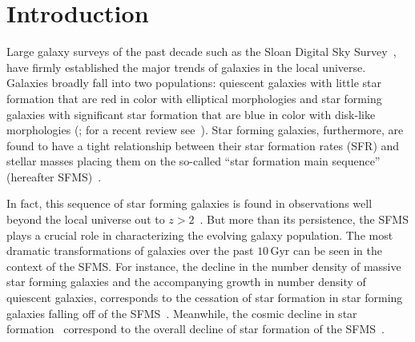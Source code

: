 \documentclass[preprint2,tighten]{aastex62}
\newcommand{\todo}[1]{{\bf \textcolor{red}{ #1}}}
\begin{document}
\section{Introduction}
Large galaxy surveys of the past decade such as the Sloan Digital Sky 
Survey~\citep[SDSS;][]{york2000}, have firmly established the major 
trends of galaxies in the local universe. Galaxies %
broadly fall into two populations: quiescent galaxies with little star
formation that are red in color with elliptical morphologies and star 
forming galaxies with significant star formation that are blue in color 
with disk-like morphologies 
(\citealt{kauffmann2003, blanton2003, baldry2006, taylor2009, moustakas2013}; 
for a recent review see~\citealt{blanton2009}). 
Star forming galaxies, furthermore, are found to have a tight relationship 
between their star formation rates (SFR) and stellar masses placing them
on the so-called ``star formation main sequence'' (hereafter 
SFMS)~\citep[\emph{e.g.}][]{noeske2007, daddi2007, salim2007}.


In fact, this sequence of star forming galaxies is found in observations 
well beyond the local universe out to $z > 2$~\citep{wang2013, schreiber2015}.
But more than its persistence, the SFMS plays a crucial role in characterizing 
the evolving galaxy population. The most dramatic transformations of 
galaxies over the past $10\,\mathrm{Gyr}$ can be seen in the context 
of the SFMS. For instance, the decline in the number density of massive 
star forming galaxies and the accompanying growth in number density of 
quiescent galaxies, corresponds to the cessation of star formation in 
star forming galaxies falling off of the 
SFMS~\citep{blanton2006, borch2006,bundy2006, moustakas2013}. 
Meanwhile, the cosmic decline in star formation~\citep{hopkins2006, behroozi2013a, madau2014}
correspond to the overall decline of star formation of the 
SFMS~\citep{schreiber2015}. 
\end{document}
